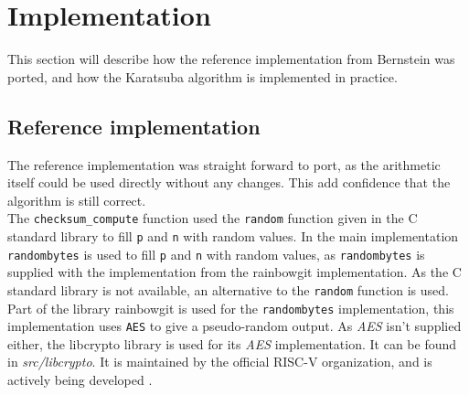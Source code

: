 \section{Implementation}
\label{section-Implementation}


This section will describe how the reference implementation from Bernstein was ported, and how the Karatsuba algorithm is implemented in practice.
\subsection{Reference implementation}
The reference implementation was straight forward to port, as the arithmetic itself could be used directly without any changes. This add confidence that the algorithm is still correct.\medskip
\\
The \texttt{checksum\_compute} function used the \texttt{random\(\)} function given in the C standard library to fill \texttt{p} and \texttt{n} with random values. In the main implementation \texttt{randombytes\(\)} is used to fill \texttt{p} and \texttt{n} with random values, as \texttt{randombytes\(\)} is supplied with the implementation from the rainbowgit implementation\cite{rainbowgit}. 
As the C standard library is not available, an alternative to the \texttt{random\(\)} function is used. Part of the library rainbowgit\cite{rainbowgit} is used for the \texttt{randombytes\(\)} implementation, this implementation uses \texttt{AES} to give a pseudo-random output. As \textit{AES} isn't supplied either, the libcrypto library\cite{libcrypto} is used for its \textit{AES} implementation. It can be found in \textit{src/libcrypto}. It is maintained by the official RISC-V organization, and is actively being developed \cite{libcrypto}.


